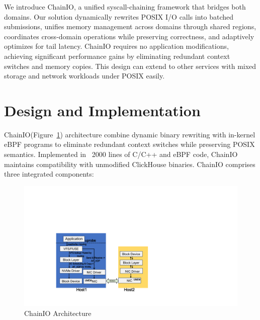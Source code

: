 \documentclass[sigconf,10pt]{acmart}
\newcommand{\sys}{ChainIO\xspace}
\begin{document}
We introduce \sys, a unified syscall-chaining framework that bridges both domains. Our solution dynamically rewrites POSIX I/O calls into batched submissions, unifies memory management across domains through shared regions, coordinates cross-domain operations while preserving correctness, and adaptively optimizes for tail latency. \sys requires no application modifications, achieving significant performance gains by eliminating redundant context switches and memory copies. This design can extend to other services with mixed storage and network workloads under POSIX easily.

\section{Design and Implementation}\label{sec:design-impl}

\sys (Figure~\ref{fig:bur}) architecture  combine dynamic binary rewriting with in-kernel eBPF programs to eliminate redundant context switches while preserving POSIX semantics. Implemented in ~2000 lines of C/C++ and eBPF code, \sys maintains compatibility with unmodified ClickHouse binaries. \sys comprises three integrated components:

\begin{figure}[h]
\centering
\includegraphics[width=\columnwidth]{img/bur.pdf}
\caption{\sys Architecture}\label{fig:bur}
\end{figure}
\end{document}
